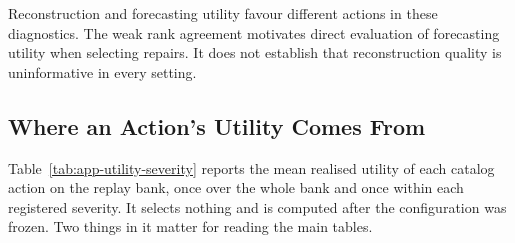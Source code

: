 \documentclass{article}
\begin{document}
\begin{table}[htbp]
  \caption{Reconstruction quality against realised forecasting utility, over the five catalog
  interventions on the reused evaluation episodes of the Bolt backbone. Reconstruction error is measured on the
  hidden positions and realised utility against \textsc{Keep} on the same backbone. Winner
  agreement is the share of episodes on which the most accurate reconstruction is also the most
  useful intervention, and the discordant rate is the share of ordered pairs whose two rankings
  disagree.}
  \label{tab:app-recutils}
  \centering
  \small
  \setlength{\tabcolsep}{4pt}
\end{table}

Reconstruction and forecasting utility favour different actions in these diagnostics.
The weak rank agreement motivates direct evaluation of forecasting utility when selecting
repairs. It does not establish that reconstruction quality is uninformative in every setting.

\subsection{Where an Action's Utility Comes From}
\label{app:utility-by-severity}
Table~\ref{tab:app-utility-severity} reports the mean realised utility of each catalog action
on the replay bank, once over the whole bank and once within each registered severity. It
selects nothing and is computed after the configuration was frozen. Two things in it matter for
reading the main tables.
\end{document}
